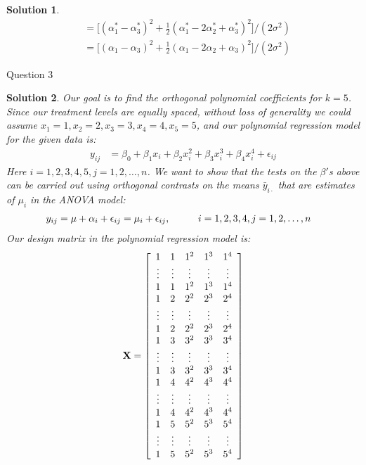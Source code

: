 \documentclass[11pt]{article}
\newtheorem{sol}{Solution}
\begin{document}
\begin{sol}
\begin{align*}
		&= \Big[(\alpha_1^{\ast} - \alpha_3^{\ast})^2 + \frac{1}{2}(\alpha_1^{\ast} - 2\alpha_2^{\ast} + \alpha_3^{\ast})^2\Big]/(2\sigma^2)\\
		&= \Big[(\alpha_1 - \alpha_3)^2 + \frac{1}{2}(\alpha_1 - 2\alpha_2 + \alpha_3)^2\Big]/(2\sigma^2)
	\end{align*}
\end{sol}

Question $3$
\begin{sol}
Our goal is to find the orthogonal polynomial coefficients for $k = 5$.\vskip 2mm
Since our treatment levels are equally spaced, without loss of generality we could assume $x_1 = 1, x_2 = 2, x_3= 3, x_4 = 4, x_5 = 5$, and our polynomial regression model for the given data is:
\begin{align*}
	y_{ij} &= \beta_0 + \beta_1 x_i + \beta_2 x_i^2 + \beta_3x_i^3 + \beta_4x_i^4 + \epsilon_{ij}
\end{align*}
Here $i = 1, 2, 3, 4,  5, j = 1, 2, \ldots, n$.\vskip 2mm
We want to show that the tests on the $\beta'$s above can be carried out using orthogonal contrasts on the means $\bar{y}_{i\cdot}$ that are estimates of $\mu_i$ in the ANOVA model:
\begin{align*}
	y_{ij} &= \mu + \alpha_i + \epsilon_{ij} = \mu_{i} + \epsilon_{ij}, \hskip 1cm i = 1, 2, 3, 4, j = 1, 2, \ldots, n
\end{align*}
Our design matrix in the polynomial regression model is:
\begin{align*}
	{\bf X} = \left[\begin{array}{ccccc} 1&1&1^2&1^3&1^4\\ \vdots&\vdots&\vdots&\vdots&\vdots\\
	1&1&1^2&1^3&1^4\\ 1 &2&2^2&2^3&2^4\\ \vdots&\vdots&\vdots&\vdots&\vdots\\
	1&2&2^2&2^3&2^4\\ 1&3&3^2&3^3&3^4\\ \vdots&\vdots&\vdots&\vdots&\vdots \\
	1&3&3^2&3^3&3^4\\ 1&4&4^2&4^3&4^4\\ \vdots&\vdots&\vdots&\vdots&\vdots\\ 1&4&4^2&4^3&4^4\\ 1&5&5^2&5^3&5^4\\ \vdots&\vdots&\vdots&\vdots&\vdots\\ 1&5&5^2&5^3&5^4 \end{array}\right]

\end{align*}
\end{sol}
\end{document}
